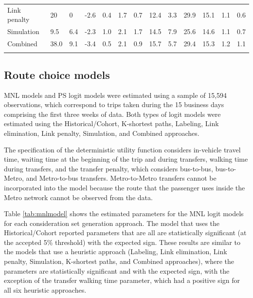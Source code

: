 \documentclass[12pt,a4paper]{article}
\begin{document}
\begin{table}[H]
\begin{tabular}{l|ll|ll|ll|ll|ll|ll}
Link penalty                                & 20          & 0          & -2.6            & 0.4           & 1.7                & 0.7              & 12.4             & 3.3             & 29.9                  & 15.1                 & 1.1                    & 0.6                   \\
Simulation                                  & 9.5         & 6.4        & -2.3            & 1.0           & 2.1                & 1.7              & 14.5             & 7.9             & 25.6                  & 14.6                 & 1.1                    & 0.7                   \\
Combined                                    & 38.0        & 9.1        & -3.4            & 0.5           & 2.1                & 0.9              & 15.7             & 5.7             & 29.4                  & 15.3                 & 1.2                    & 1.1        \\    
\noalign{\smallskip}\hline
\end{tabular}
\end{table}

\subsection{Route choice models}

MNL models and PS logit models were estimated using a sample of 15,594 observations, which correspond to trips taken during the 15 business days comprising the first three weeks of data. Both types of logit models were estimated using the  Historical/Cohort, K-shortest paths, Labeling, Link elimination, Link penalty, Simulation, and Combined approaches. 

The specification of the deterministic utility function considers in-vehicle travel time, waiting time at the beginning of the trip and during transfers, walking time during transfers, and the transfer penalty, which considers bus-to-bus, bus-to-Metro, and Metro-to-bus transfers. Metro-to-Metro transfers cannot be incorporated into the model because the route that the passenger uses inside the Metro network cannot be observed from the data. 

Table \ref{tab:mnlmodel} shows the estimated parameters for the MNL logit models for each consideration set generation approach. The model that uses the Historical/Cohort reported parameters that are all are statistically significant (at the accepted 5\% threshold) with the expected sign. These results are similar to the models that use a heuristic approach (Labeling, Link elimination, Link penalty, Simulation, K-shortest paths, and Combined approaches), where the parameters are statistically significant and with the expected sign, with the exception of the transfer walking time parameter, which had a positive sign for all six heuristic approaches. 
\end{document}

